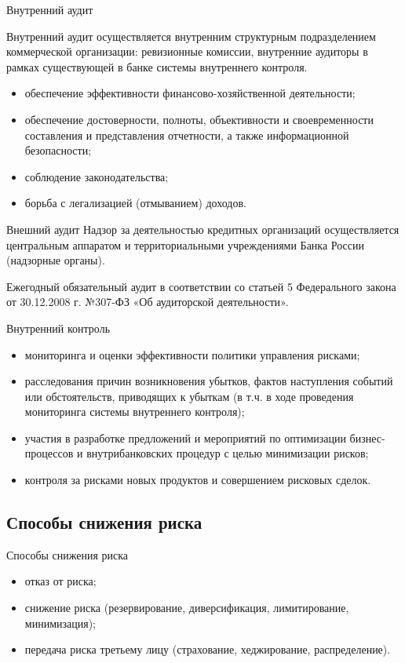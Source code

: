 \documentclass[financial_risks_lectures.tex]{subfiles}
\begin{document}
\begin{frame}[shrink=5]{Внутренний аудит}
\begin{block}{Внутренний аудит}
\quad осуществляется внутренним структурным подразделением коммерческой организации: ревизионные комиссии, внутренние аудиторы в рамках существующей в банке системы внутреннего контроля.
\end{block}

\begin{itemize}[<+->]
\item
обеспечение эффективности финансово-хозяйственной деятельности;
\item
обеспечение достоверности, полноты, объективности и своевременности составления и представления отчетности, а также информационной безопасности;
\item
соблюдение законодательства;
\item
борьба с легализацией (отмыванием) доходов.
\end{itemize}
\end{frame}

\begin{frame}{Внешний аудит}
Надзор за деятельностью кредитных организаций осуществляется центральным аппаратом и территориальными учреждениями Банка России (надзорные органы).

Ежегодный обязательный аудит в соответствии со статьей 5 Федерального закона от 30.12.2008 г. №307-ФЗ «Об аудиторской деятельности».
\end{frame}

\begin{frame}{Внутренний контроль}
\begin{itemize}[<+->]
\item
мониторинга и оценки эффективности политики управления рисками;
\item
расследования причин возникновения убытков, фактов наступления событий или обстоятельств, приводящих к убыткам (в т.ч. в ходе проведения мониторинга системы внутреннего контроля);
\item
участия в разработке предложений и мероприятий по оптимизации бизнес-процессов и внутрибанковских процедур с целью минимизации рисков;
\item
контроля за рисками новых продуктов и совершением рисковых сделок.
\end{itemize}
\end{frame}
\subsection{Способы снижения риска}
\begin{frame}{Способы снижения риска}
\begin{itemize}
\item
отказ от риска;
\item
снижение риска (резервирование, диверсификация, лимитирование, минимизация);
\item
передача риска третьему лицу (страхование, хеджирование, распределение).
\end{itemize}
\end{frame}
\end{document}
